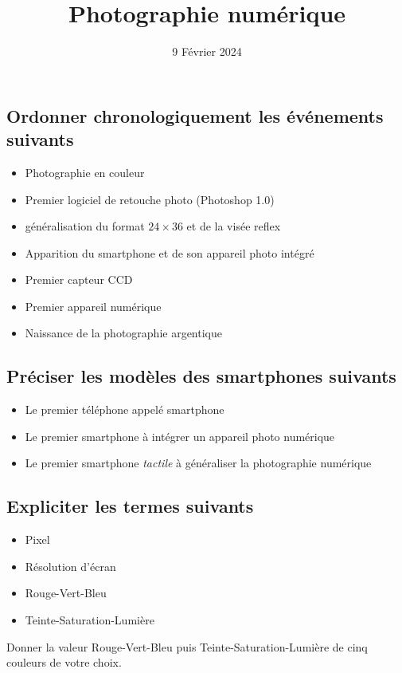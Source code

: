 \documentclass{article}
\title{Photographie numérique}
\date{9 Février 2024}
\author{}
\begin{document}
\maketitle

\subsection*{Ordonner chronologiquement les événements suivants}
\begin{itemize}
\item Photographie en couleur
\item Premier logiciel de retouche photo (Photoshop 1.0)
\item généralisation du format $24 \times 36$ et de la visée reflex
\item Apparition du smartphone et de son appareil photo intégré
\item Premier capteur CCD
\item Premier appareil numérique
\item Naissance de la photographie argentique
\end{itemize}
\subsection*{Préciser les modèles des smartphones suivants}
\begin{itemize}
\item Le premier téléphone appelé \og smartphone \fg
\item Le premier smartphone à intégrer un appareil photo numérique
\item Le premier smartphone \emph{tactile} à généraliser la photographie numérique  
\end{itemize}
\subsection*{Expliciter les termes suivants}
\begin{itemize}
\item Pixel
\item Résolution d'écran
\item Rouge-Vert-Bleu
\item Teinte-Saturation-Lumière
\end{itemize}
Donner la valeur Rouge-Vert-Bleu puis Teinte-Saturation-Lumière de cinq couleurs de votre choix.
\end{document}
